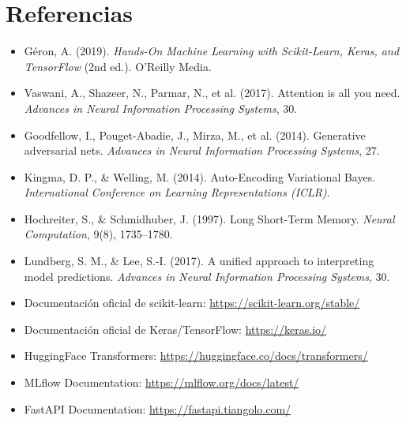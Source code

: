 \documentclass[12pt, a4paper]{article}
\begin{document}
\newpage
\section*{Referencias}

\begin{itemize}[leftmargin=*]
  \item Géron, A. (2019). \textit{Hands-On Machine Learning with Scikit-Learn, Keras, and TensorFlow} (2nd ed.). O'Reilly Media.
  \item Vaswani, A., Shazeer, N., Parmar, N., et al. (2017). Attention is all you need. \textit{Advances in Neural Information Processing Systems}, 30.
  \item Goodfellow, I., Pouget-Abadie, J., Mirza, M., et al. (2014). Generative adversarial nets. \textit{Advances in Neural Information Processing Systems}, 27.
  \item Kingma, D. P., \& Welling, M. (2014). Auto-Encoding Variational Bayes. \textit{International Conference on Learning Representations (ICLR)}.
  \item Hochreiter, S., \& Schmidhuber, J. (1997). Long Short-Term Memory. \textit{Neural Computation}, 9(8), 1735--1780.
  \item Lundberg, S. M., \& Lee, S.-I. (2017). A unified approach to interpreting model predictions. \textit{Advances in Neural Information Processing Systems}, 30.
  \item Documentación oficial de scikit-learn: \url{https://scikit-learn.org/stable/}
  \item Documentación oficial de Keras/TensorFlow: \url{https://keras.io/}
  \item HuggingFace Transformers: \url{https://huggingface.co/docs/transformers/}
  \item MLflow Documentation: \url{https://mlflow.org/docs/latest/}
  \item FastAPI Documentation: \url{https://fastapi.tiangolo.com/}
\end{itemize}
\end{document}
